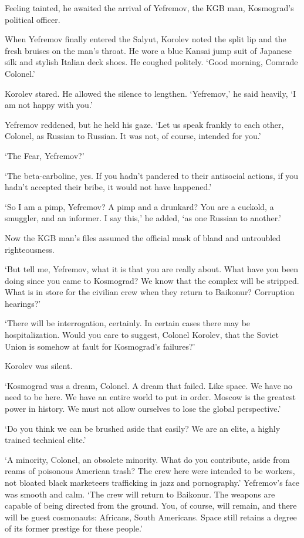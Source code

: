 Feeling tainted, he awaited the arrival of Yefremov, the KGB man, Kosmograd's political officer.

When Yefremov finally entered the Salyut, Korolev noted the split lip and the fresh bruises on the man's throat. He wore a blue Kansai jump suit of Japanese silk and stylish Italian deck shoes. He coughed politely. `Good morning, Comrade Colonel.'

Korolev stared. He allowed the silence to lengthen. `Yefremov,' he said heavily, `I am not happy with you.'

Yefremov reddened, but he held his gaze. `Let us speak frankly to each other, Colonel, as Russian to Russian. It was not, of course, intended for you.'

`The Fear, Yefremov?'

`The beta-carboline, yes. If you hadn't pandered to their antisocial actions, if you hadn't accepted their bribe, it would not have happened.'

`So I am a pimp, Yefremov? A pimp and a drunkard? You are a cuckold, a smuggler, and an informer. I say this,' he added, `as one Russian to another.'

Now the KGB man's files assumed the official mask of bland and untroubled righteousness.

`But tell me, Yefremov, what it is that you are really about. What have you been doing since you came to Kosmograd? We know that the complex will be stripped. What is in store for the civilian crew when they return to Baikonur? Corruption hearings?'

`There will be interrogation, certainly. In certain cases there may be hospitalization. Would you care to suggest, Colonel Korolev, that the Soviet Union is somehow at fault for Kosmograd's failures?'

Korolev was silent.

`Kosmograd was a dream, Colonel. A dream that failed. Like space. We have no need to be here. We have an entire world to put in order. Moscow is the greatest power in history. We must not allow ourselves to lose the global perspective.'

`Do you think we can be brushed aside that easily? We are an elite, a highly trained technical elite.'

`A minority, Colonel, an obsolete minority. What do you contribute, aside from reams of poisonous American trash? The crew here were intended to be workers, not bloated black marketeers trafficking in jazz and pornography.' Yefremov's face was smooth and calm. `The crew will return to Baikonur. The weapons are capable of being directed from the ground. You, of course, will remain, and there will be guest cosmonauts: Africans, South Americans. Space still retains a degree of its former prestige for these people.'


